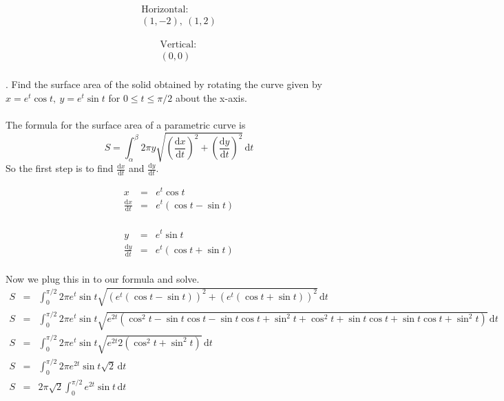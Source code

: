 \documentclass[11pt]{exam}
\begin{document}
\noindent
\begin{minipage}{.5\linewidth}
	\begin{eqnarray*}
		\mathrm{Horizontal:}\\
		(1,-2),\ (1,2)
	\end{eqnarray*}
\end{minipage}
\begin{minipage}{.5\linewidth}
	\begin{eqnarray*}
		\mathrm{Vertical:}\\
		(0,0)\\
	\end{eqnarray*}
\end{minipage}



. Find the surface area of the solid obtained by rotating the curve given by $x = e^t \cos t,\ y = e^t \sin t$ for $0 \leq t \leq \pi/2$ about the x-axis. \\
\\
The formula for the surface area of a parametric curve is
$$S = \int_\alpha^\beta \! 2\pi y \sqrt{\left(\frac{\mathrm{d}x}{\mathrm{d}t}\right)^2+\left(\frac{\mathrm{d}y}{\mathrm{d}t}\right)^2} \, \mathrm{d}t$$
So the first step is to find $\frac{\mathrm{d}x}{\mathrm{d}t}$ and $\frac{\mathrm{d}y}{\mathrm{d}t}$.\\
\noindent
\begin{minipage}{.5\linewidth}
	\begin{eqnarray*}
		x &=& e^t \cos t\\
 		\frac{\mathrm{d}x}{\mathrm{d}t}&=&e^t (\cos t - \sin t) \\
	\end{eqnarray*}
\end{minipage}
\begin{minipage}{.5\linewidth}
	\begin{eqnarray*}
  		y&=&e^t \sin t\\
  		\frac{\mathrm{d}y}{\mathrm{d}t}&=&e^t (\cos t + \sin t) \\
	\end{eqnarray*}
\end{minipage}
Now we plug this in to our formula and solve.\\
\begin{eqnarray*}
	S &=& \int_0^{\pi/2} \! 2\pi e^t \sin t \sqrt{\left(e^t (\cos t - \sin t)\right)^2+\left(e^t (\cos t + \sin t)\right)^2} \, \mathrm{d}t \\	
	S &=& \int_0^{\pi/2} \! 2\pi e^t \sin t \sqrt{e^{2t}(\cos^2t -\sin t\cos t -\sin t\cos t+\sin^2 t + \cos^2 t+\sin t\cos t+\sin t\cos t+\sin^2 t)} \, \mathrm{d}t \\
	S &=& \int_0^{\pi/2} \! 2\pi e^t \sin t \sqrt{e^{2t}2(\cos^2 t + \sin^2 t)} \, \mathrm{d}t \\	
	S &=& \int_0^{\pi/2} \! 2\pi e^{2t} \sin t \sqrt{2} \, \mathrm{d}t \\
	S &=& 2\pi\sqrt{2} \int_0^{\pi/2} \! e^{2t} \sin t  \, \mathrm{d}t \\	
\end{eqnarray*} 
\end{document}
